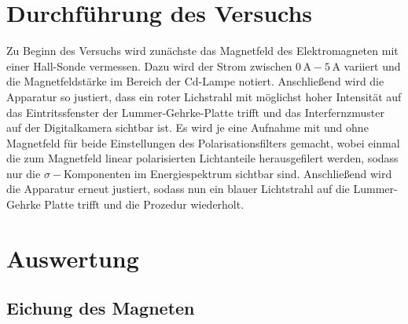 \section{Durchführung des Versuchs}
Zu Beginn des Versuchs wird zunächste das Magnetfeld des Elektromagneten mit einer Hall-Sonde vermessen. Dazu wird der Strom zwischen $0\,\si{\A}-5\,\si{\A}$ variiert und die Magnetfeldstärke im Bereich der
Cd-Lampe notiert.
Anschließend wird die Apparatur so justiert, dass ein roter Lichstrahl mit möglichst hoher Intensität auf das Eintritssfenster der Lummer-Gehrke-Platte trifft und das Interfernzmuster auf der Digitalkamera sichtbar ist.
Es wird je eine Aufnahme mit und ohne Magnetfeld für beide Einstellungen des Polarisationsfilters gemacht, wobei einmal die zum Magnetfeld linear polarisierten Lichtanteile herausgefilert werden, sodass nur die $\sigma-$Komponenten
im Energiespektrum sichtbar sind.
Anschließend wird die Apparatur erneut justiert, sodass nun ein blauer Lichtstrahl auf die Lummer-Gehrke Platte trifft und die Prozedur wiederholt.

\section{Auswertung}
\subsection{Eichung des Magneten}





\nocite{wingate}
\nocite{*}
\printbibliography

